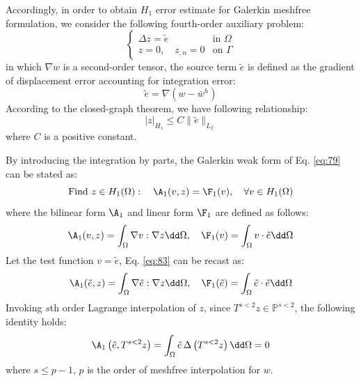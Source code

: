 Accordingly, in order to obtain $H_1$ error estimate for Galerkin meshfree formulation, we consider the following fourth-order auxiliary problem:
\begin{equation}\label{eq:79}
\begin{cases}
\Delta z=\tilde{e} & \text{in }\Omega\\[2pt]
z=0,\quad z_{,n}=0 & \text{on }\Gamma
\end{cases}
\end{equation}
in which $\nabla w$ is a second-order tensor, the source term $\tilde{e}$ is defined as the gradient of displacement error accounting for integration error:
\begin{equation}\label{eq:80}
\tilde{e}=\nabla\left(w-\bar{w}^{h}\right)
\end{equation}
According to the closed-graph theorem, we have following relationship:
\begin{equation}\label{eq:81}
|z|_{H_1}\le C\|\tilde{e}\|_{L_2}
\end{equation}
where $C$ is a positive constant.

By introducing the integration by parts, the Galerkin weak form of Eq. \eqref{eq:79} can be stated as:
\begin{equation}\label{eq:82}
\text{Find }z\in H_1(\Omega):\quad \A_1(v,z)=\F_1(v),\quad \forall v\in H_1(\Omega)
\end{equation}
where the bilinear form $\A_1$ and linear form $\F_1$ are defined as follows:
\begin{equation}\label{eq:83}
\A_1(v,z)=\int_{\Omega}\nabla v:\nabla z\dd\Omega,\quad
\F_1(v)=\int_{\Omega}v\cdot\tilde{e}\dd\Omega
\end{equation}
Let the test function $v=\tilde{e}$, Eq. \eqref{eq:83} can be recast as:
\begin{equation}\label{eq:84}
\A_1(\tilde{e},z)=\int_{\Omega}\nabla\tilde{e}:\nabla z\dd\Omega,\quad
\F_1(\tilde{e})=\int_{\Omega}\tilde{e}\cdot\tilde{e}\dd\Omega
\end{equation}
Invoking $s$th order Lagrange interpolation of $z$, since $T^{s<2}z\in\mathbb{P}^{s<2}$, the following identity holds:
\begin{equation}\label{eq:85}
\A_1\left(\tilde{e},T^{s<2}z\right)=\int_{\Omega}\tilde{e}\,\Delta\left(T^{s<2}z\right)\dd\Omega=0
\end{equation}
where $s\le p-1$, $p$ is the order of meshfree interpolation for $w$.

